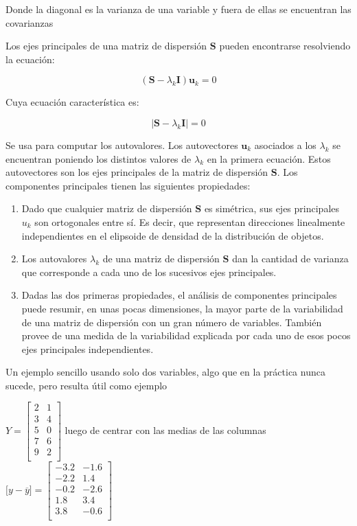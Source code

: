\documentclass[]{book}
\theoremstyle{definition}
\theoremstyle{definition}
\theoremstyle{definition}
\theoremstyle{remark}
\begin{document}
Donde la diagonal es la varianza de una variable y fuera de ellas se
encuentran las covarianzas

Los ejes principales de una matriz de dispersión \(\mathbf{S}\) pueden
encontrarse resolviendo la ecuación:

\[
\left( \mathbf{S} - \lambda_{k}\mathbf{I} \right)\mathbf{u}_{k} = 0
\]

Cuya ecuación característica es:

\[
\left| \mathbf{S} - \lambda_{k}\mathbf{I} \right| = 0
\]

Se usa para computar los autovalores. Los autovectores
\(\mathbf{u}_{k}\) asociados a los \(\lambda_{k}\) se encuentran
poniendo los distintos valores de \(\lambda_{k}\) en la primera
ecuación. Estos autovectores son los ejes principales de la matriz de
dispersión \(\mathbf{S}\). Los componentes principales tienen las
siguientes propiedades:

\begin{enumerate}
\def\labelenumi{\arabic{enumi}.}
\item
  Dado que cualquier matriz de dispersión \(\mathbf{S}\) es simétrica,
  sus ejes principales \(u_{k}\) son ortogonales entre sí. Es decir, que
  representan direcciones linealmente independientes en el elipsoide de
  densidad de la distribución de objetos.
\item
  Los autovalores \(\lambda_{k}\) de una matriz de dispersión
  \(\mathbf{S}\) dan la cantidad de varianza que corresponde a cada uno
  de los sucesivos ejes principales.
\item
  Dadas las dos primeras propiedades, el análisis de componentes
  principales puede resumir, en unas pocas dimensiones, la mayor parte
  de la variabilidad de una matriz de dispersión con un gran número de
  variables. También provee de una medida de la variabilidad explicada
  por cada uno de esos pocos ejes principales independientes.
\end{enumerate}

Un ejemplo sencillo usando solo dos variables, algo que en la práctica
nunca sucede, pero resulta útil como ejemplo

\(Y = \begin{bmatrix} 2 & 1 \\ 3 & 4 \\ 5 & 0 \\ 7 & 6 \\ 9 & 2 \\ \end{bmatrix}\)
luego de centrar con las medias de las columnas
\(\lbrack y - \overline{y} \rbrack = \begin{bmatrix} - 3.2 & - 1.6 \\ - 2.2 & 1.4 \\ - 0.2 & - 2.6 \\ 1.8 & 3.4 \\ 3.8 & - 0.6 \\ \end{bmatrix}\)
\end{document}
